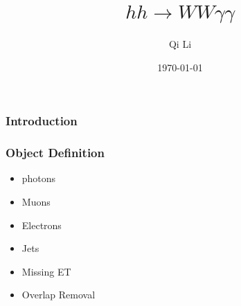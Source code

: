 \documentclass[preprint,review,16px]{beamer}
\date{\today}
\begin{document}
\title{$hh\rightarrow WW\gamma\gamma$}
\author{Qi Li}
\maketitle
\fancyhf{} 

\begin{frame}%
\vspace{3mm}
\frametitle{Introduction}



\vspace{3mm}
\end{frame}


\begin{frame}%
\vspace{3mm}
\frametitle{Object Definition}
  \begin{itemize}
    \item photons
    \item Muons
    \item Electrons
    \item Jets
    \item Missing ET
    \item Overlap Removal
  \end{itemize}

\vspace{3mm}
\end{frame}
\end{document}
